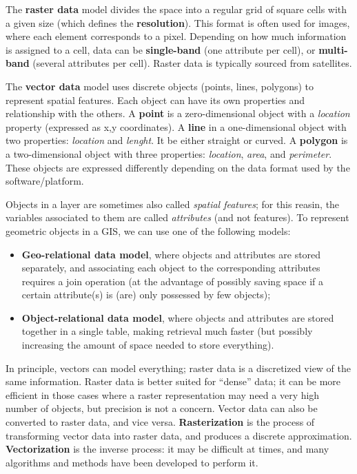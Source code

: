 The \textbf{raster data} model divides the space into a regular grid of square cells with a given size (which defines the \textbf{resolution}). This format is often used for images, where each element corresponds to a pixel. Depending on how much information is assigned to a cell, data can be \textbf{single-band} (one attribute per cell), or \textbf{multi-band} (several attributes per cell). Raster data is typically sourced from satellites.

The \textbf{vector data} model uses discrete objects (points, lines, polygons) to represent spatial features. Each object can have its own properties and relationship with the others. A \textbf{point} is a zero-dimensional object with a \textit{location} property (expressed as x,y coordinates). A \textbf{line} in a one-dimensional object with two properties: \textit{location} and \textit{lenght}. It be either straight or curved. A \textbf{polygon} is a two-dimensional object with three properties: \textit{location}, \textit{area}, and \textit{perimeter}. These objects are expressed differently depending on the data format used by the software/platform.

Objects in a layer are sometimes also called \textit{spatial features}; for this reasin, the variables associated to them are called \textit{attributes} (and not features). To represent geometric objects in a GIS, we can use one of the following models:
\begin{itemize}
    \item \textbf{Geo-relational data model}, where objects and attributes are stored separately, and associating each object to the corresponding attributes requires a join operation (at the advantage of possibly saving space if a certain attribute(s) is (are) only possessed by few objects);
    \item \textbf{Object-relational data model}, where objects and attributes are stored together in a single table, making retrieval much faster (but possibly increasing the amount of space needed to store everything). 
\end{itemize}

In principle, vectors can model everything; raster data is a discretized view of the same information. Raster data is better suited for ``dense'' data; it can be more efficient in those cases where a raster representation may need a very high number of objects, but precision is not a concern. Vector data can also be converted to raster data, and vice versa. \textbf{Rasterization} is the process of transforming vector data into raster data, and produces a discrete approximation. \textbf{Vectorization} is the inverse process: it may be difficult at times, and many algorithms and methods have been developed to perform it.

